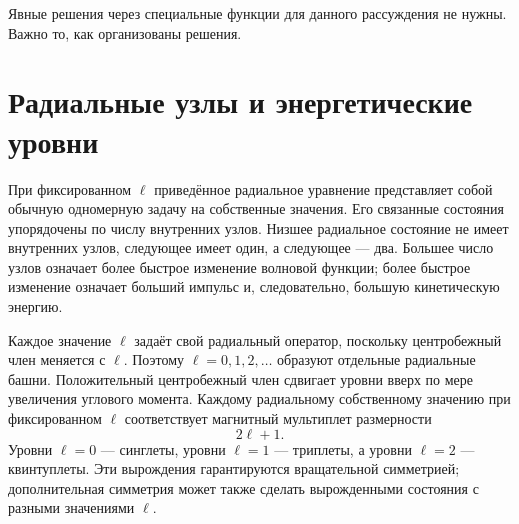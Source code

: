 \begin{classroomqa}
\end{classroomqa}

\begin{classroomqa}
\end{classroomqa}

Явные решения через специальные функции для данного рассуждения не нужны. Важно то, как организованы решения.

\section{Радиальные узлы и энергетические уровни}

При фиксированном \(\ell\) приведённое радиальное уравнение представляет собой обычную одномерную задачу на собственные значения. Его связанные состояния упорядочены по числу внутренних узлов. Низшее радиальное состояние не имеет внутренних узлов, следующее имеет один, а следующее — два. Большее число узлов означает более быстрое изменение волновой функции; более быстрое изменение означает больший импульс и, следовательно, большую кинетическую энергию.

Каждое значение \(\ell\) задаёт свой радиальный оператор, поскольку центробежный член меняется с \(\ell\). Поэтому \(\ell=0,1,2,\ldots\) образуют отдельные радиальные башни. Положительный центробежный член сдвигает уровни вверх по мере увеличения углового момента. Каждому радиальному собственному значению при фиксированном \(\ell\) соответствует магнитный мультиплет размерности
\begin{equation}
2\ell+1.
\end{equation}
Уровни \(\ell=0\) — синглеты, уровни \(\ell=1\) — триплеты, а уровни \(\ell=2\) — квинтуплеты. Эти вырождения гарантируются вращательной симметрией; дополнительная симметрия может также сделать вырожденными состояния с разными значениями \(\ell\).

